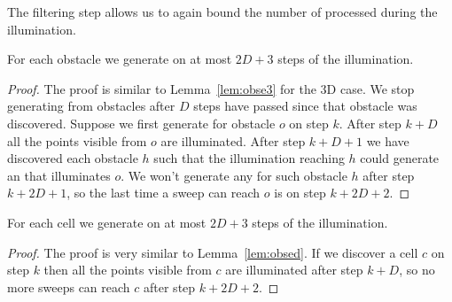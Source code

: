 \documentclass[english,gradu]{tktltiki2018}
\begin{document}
The filtering step allows us to again bound the number of \addEs processed during the illumination.

\begin{lem}\label{lem:obsed}For each obstacle we generate \obsE on at most $2D+3$ steps of the illumination.\end{lem}
\begin{proof}
The proof is similar to Lemma~\ref{lem:obse3} for the 3D case.
We stop generating \addEs from obstacles after $D$ steps have passed since that obstacle was discovered.
Suppose we first generate \obsE for obstacle $o$ on step $k$.
After step $k+D$ all the points visible from $o$ are illuminated.
After step $k+D+1$ we have discovered each obstacle $h$ such that the illumination reaching $h$ could generate an \addE that illuminates $o$.
We won't generate any \addEs for such obstacle $h$ after step $k+2D+1$, so the last time a sweep can reach $o$ is on step $k+2D+2$.
\end{proof}

\begin{lem}\label{lem:celled}For each cell we generate \cellE on at most $2D+3$ steps of the illumination.\end{lem}
\begin{proof}
The proof is very similar to Lemma~\ref{lem:obsed}.
If we discover a cell $c$ on step $k$ then all the points visible from $c$ are illuminated after step $k+D$, so no more sweeps can reach $c$ after step $k+2D+2$.
\end{proof}
\end{document}
